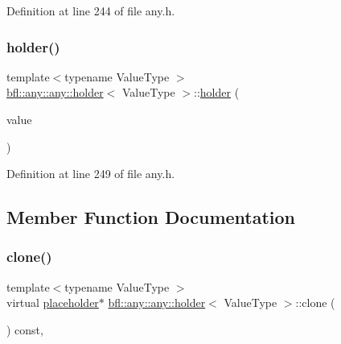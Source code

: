 Definition at line 244 of file any.\+h.

\mbox{\label{classbfl_1_1any_1_1any_1_1holder_a6c0d9a341712608c6b4e023c1904ed0b}} 
\subsubsection{\texorpdfstring{holder()}{holder()}\hspace{0.1cm}{\footnotesize\ttfamily [2/2]}}
{\footnotesize\ttfamily template$<$typename Value\+Type $>$ \\
\mbox{\hyperlink{classbfl_1_1any_1_1any_1_1holder}{bfl\+::any\+::any\+::holder}}$<$ Value\+Type $>$\+::\mbox{\hyperlink{classbfl_1_1any_1_1any_1_1holder}{holder}} (\begin{DoxyParamCaption}\item[{Value\+Type \&\&}]{value }\end{DoxyParamCaption})\hspace{0.3cm}{\ttfamily [inline]}}



Definition at line 249 of file any.\+h.



\subsection{Member Function Documentation}
\mbox{\label{classbfl_1_1any_1_1any_1_1holder_aa291292df117432eeac1950b3a2677b3}} 
\subsubsection{\texorpdfstring{clone()}{clone()}}
{\footnotesize\ttfamily template$<$typename Value\+Type $>$ \\
virtual \mbox{\hyperlink{classbfl_1_1any_1_1any_1_1placeholder}{placeholder}}$\ast$ \mbox{\hyperlink{classbfl_1_1any_1_1any_1_1holder}{bfl\+::any\+::any\+::holder}}$<$ Value\+Type $>$\+::clone (\begin{DoxyParamCaption}{ }\end{DoxyParamCaption}) const\hspace{0.3cm}{\ttfamily [inline]}, {\ttfamily [virtual]}}



